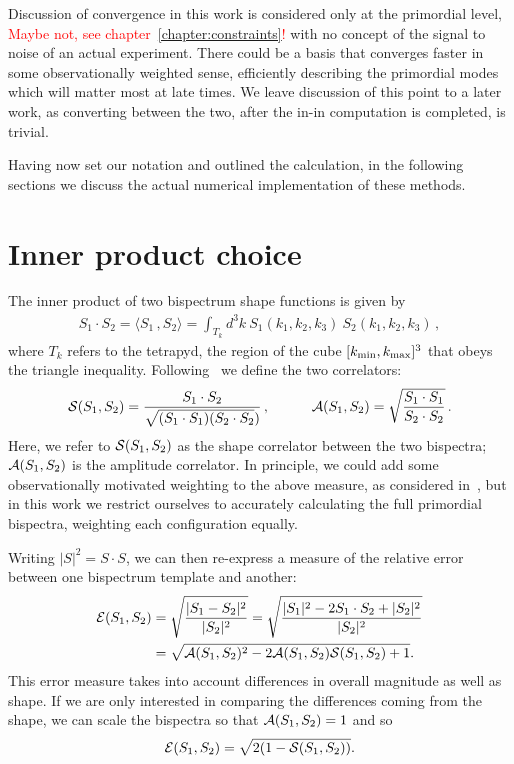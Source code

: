 Discussion of convergence in this work is considered only at the primordial level,
\textcolor{red}{Maybe not, see chapter~\ref{chapter:constraints}!}
with no concept of the signal to noise of an actual experiment.
There could be a basis that converges faster in some observationally weighted sense,
efficiently describing the primordial modes which will matter most at late times.
We leave discussion of this point to a later work, as converting between the two,
after the in-in computation is completed, is trivial.


Having now set our notation and outlined the calculation, in the following sections we
discuss the actual numerical implementation of these methods.
\section{Inner product choice}\label{sec:inner_product}
The inner product of two bispectrum shape functions is given by 
\begin{align}
    S_1\cdot S_2  = \langle S_1\,, S_2 \rangle = \int_{T_k} d^3k \: S_1(k_1,k_2,k_3) \: S_2(k_1,k_2,k_3)\,,\label{inner_prod}
\end{align}
where $T_k$ refers to the tetrapyd, the region of the cube $[{k_\text{min}},{k_\text{max}}]^3$ that obeys the triangle inequality.
Following~\cite{hung_1902}
we define the two correlators:
\begin{align}
    \mathcal{S}(S_1,S_2) = \frac{S_1\cdot S_2}{\sqrt{(S_1\cdot S_1)(S_2\cdot S_2})}\,, \qquad\quad 
\mathcal{A}(S_1,S_2) = \sqrt{\frac{S_1\cdot S_1}{S_2\cdot S_2}}\,.
\end{align}
Here, we refer to $\mathcal{S}(S_1,S_2)$ as the shape correlator between the two bispectra;
$\mathcal{A}(S_1,S_2)$ is the amplitude correlator.
In principle, we could add some observationally motivated weighting
to the above measure, as considered in~\cite{FergShell_1,FergShell_2,FergShell_3},
but in this work we restrict ourselves to accurately calculating the
full primordial bispectra, weighting each configuration equally.

Writing $|S|^2=S\cdot S$,
we can then re-express a measure of the relative error
between one bispectrum template and another:
\begin{align}\label{relative_difference}
\mathcal{E}(S_1,S_2) &= \sqrt{\frac{|S_1-S_2|^2}{|S_2|^2}}  = \sqrt{\frac{|S_1|^2-2S_1\cdot S_2+|S_2|^2}{|S_2|^2}}\nonumber\\
	   &= \sqrt{\mathcal{A}(S_1,S_2)^2-2\mathcal{A}(S_1,S_2)\mathcal{S}(S_1,S_2)+1}.
\end{align}
This error measure takes into account differences in overall magnitude as well as shape.
If we are only interested in comparing the differences coming from the shape,
we can scale the bispectra so that $\mathcal{A}(S_1,S_2)=1$ and so
\begin{align}\label{relative_difference_scaled}
    \mathcal{E}(S_1,S_2) = \sqrt{2(1-\mathcal{S}(S_1,S_2))}.
\end{align}


